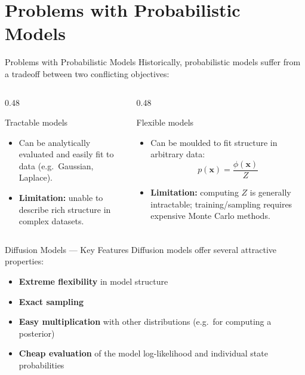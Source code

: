 \documentclass[aspectratio=169,10pt]{beamer}
\newcommand{\bx}{\bm{x}}
\begin{document}
\section{Problems with Probabilistic Models}

\begin{frame}{Problems with Probabilistic Models}
  Historically, probabilistic models suffer from a tradeoff between two
  conflicting objectives:
  \vspace{4pt}
  \begin{columns}[T]
    \begin{column}{0.48\textwidth}
      \begin{block}{Tractable models}
        \begin{itemize}
          \item Can be analytically evaluated and easily fit to data
                (e.g.\ Gaussian, Laplace).
          \item \textbf{Limitation:} unable to describe rich structure in
                complex datasets.
        \end{itemize}
      \end{block}
    \end{column}
    \begin{column}{0.48\textwidth}
      \begin{block}{Flexible models}
        \begin{itemize}
          \item Can be moulded to fit structure in arbitrary data:
                \[
                  p\!\left(\bx\right) = \frac{\phi\!\left(\bx\right)}{Z}
                \]
          \item \textbf{Limitation:} computing $Z$ is generally intractable;
                training/sampling requires expensive Monte Carlo methods.
        \end{itemize}
      \end{block}
    \end{column}
  \end{columns}
\end{frame}

\begin{frame}{Diffusion Models — Key Features}
  Diffusion models offer several attractive properties:
  \begin{itemize}
    \item \textbf{Extreme flexibility} in model structure
    \item \textbf{Exact sampling}
    \item \textbf{Easy multiplication} with other distributions
          (e.g.\ for computing a posterior)
    \item \textbf{Cheap evaluation} of the model log-likelihood and
          individual state probabilities
  \end{itemize}
\end{frame}
\end{document}
